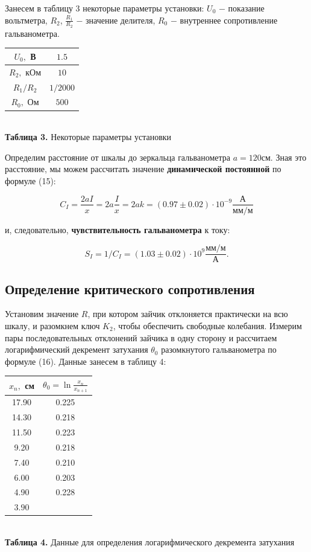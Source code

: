 \documentclass[a4paper,12pt]{article} %
\begin{document}
\hfill \break Занесем в таблицу 3 некоторые параметры установки: $U_{0}$ $-$ показание вольтметра, $R_{2}$, $\frac{R_{1}}{R_{2}}$ $-$ значение делителя, $R_{0}$ $-$ внутреннее сопротивление гальванометра.
 
\begin{center}
\begin{tabular}{|c|c|}\hline
$ U_{0}, $ В & $ 1.5 $\\\hline
$ R_{2}, $ кОм & $ 10 $\\\hline
$ R_{1}/R_{2} $ & $ 1/2000 $\\\hline
$ R_{0}, $ Ом & $ 500 $\\\hline
\end{tabular} \\
\hfill \break \textbf {Таблица 3.} Некоторые параметры установки\\
\end{center}

\hfill \break Определим расстояние от шкалы до зеркальца гальванометра $a = 120$см. Зная это расстояние, мы можем рассчитать значение \textbf{динамической постоянной} по формуле (15):

$$
C_{I} = \frac{2aI}{x} = 2a\frac{I}{x} = 2ak = (0.97 \pm 0.02) \cdot 10^{-9} \frac{\text{А}}{\text{мм}/\text{м}}
$$

\hfill \break и, следовательно, \textbf{чувствительность гальванометра} к току:

$$
S_{I} = 1/C_{I} = (1.03 \pm 0.02) \cdot 10^9 \frac{\text{мм}/\text{м}}{\text{А}}.
$$

\subsection{Определение критического сопротивления}
\hfill \break Установим значение $R$, при котором зайчик отклоняется практически на всю шкалу, и разомкнем ключ $K_{2}$, чтобы обеспечить свободные колебания. Измерим пары последовательных отклонений зайчика в одну сторону и рассчитаем логарифмический декремент затухания $\theta_0$ разомкнутого гальванометра по формуле (16). Данные занесем в таблицу 4:

\begin{center}
\begin{tabular}{|c|c|}\hline
$ x_{n}, $ см & $ \theta_{0} = \ln{\frac{x_{n}}{x_{n+1}}} $\\\hline
17.90 & 0.225 \\\hline
14.30 & 0.218 \\\hline
11.50 & 0.223 \\\hline
9.20 & 0.218 \\\hline
7.40 & 0.210 \\\hline
6.00 & 0.203 \\\hline
4.90 & 0.228 \\\hline
$3.90$ & $ $ \\\hline
\end{tabular} \\
\hfill \break \textbf {Таблица 4.} Данные для определения логарифмического декремента затухания\\
\end{center}
\end{document}
